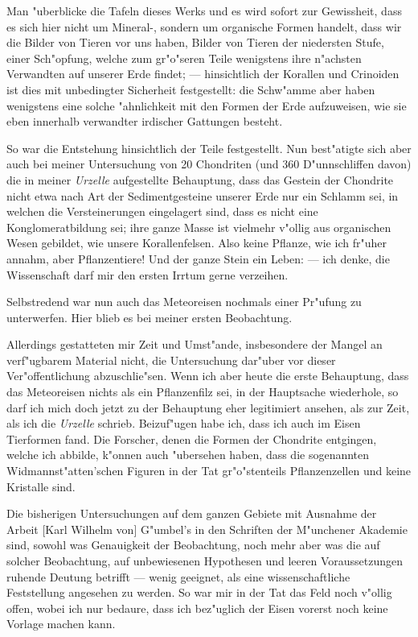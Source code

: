 \documentclass[a4paper, 11pt, oneside]{article}
\begin{document}
Man "uberblicke die Tafeln dieses Werks und es wird sofort zur Gewissheit, dass es sich hier nicht um Mineral-, sondern um organische Formen handelt, dass wir die Bilder von Tieren vor uns haben, Bilder von Tieren der niedersten Stufe, einer Sch"opfung, welche zum gr"o"seren Teile wenigstens ihre n"achsten Verwandten auf unserer Erde findet; --- hinsichtlich der Korallen und Crinoiden ist dies mit unbedingter Sicherheit festgestellt: die Schw"amme aber haben wenigstens eine solche "ahnlichkeit mit den Formen der Erde aufzuweisen, wie sie eben innerhalb verwandter irdischer Gattungen besteht.

So war die Entstehung hinsichtlich der Teile festgestellt. Nun best"atigte sich aber auch bei meiner Untersuchung von 20 Chondriten (und 360 D"unnschliffen davon) die in meiner \emph{Urzelle} aufgestellte Behauptung, dass das Gestein der Chondrite nicht etwa nach Art der Sedimentgesteine unserer Erde nur ein Schlamm sei, in welchen die Versteinerungen eingelagert sind, dass es nicht eine Konglomeratbildung sei; ihre ganze Masse ist vielmehr v"ollig aus organischen Wesen gebildet, wie unsere Korallenfelsen. Also keine Pflanze, wie ich fr"uher annahm, aber Pflanzentiere! Und der ganze Stein ein Leben: --- ich denke, die Wissenschaft darf mir den ersten Irrtum gerne verzeihen.

Selbstredend war nun auch das Meteoreisen nochmals einer Pr"ufung zu unterwerfen. Hier blieb es bei meiner ersten Beobachtung.

Allerdings gestatteten mir Zeit und Umst"ande, insbesondere der Mangel an verf"ugbarem Material nicht, die Untersuchung dar"uber vor dieser Ver"offentlichung abzuschlie"sen. Wenn ich aber heute die erste Behauptung, dass das Meteoreisen nichts als ein Pflanzenfilz sei, in der Hauptsache wiederhole, so darf ich mich doch jetzt zu der Behauptung eher legitimiert ansehen, als zur Zeit, als ich die \emph{Urzelle} schrieb. Beizuf"ugen habe ich, dass ich auch im Eisen Tierformen fand. Die Forscher, denen die Formen der Chondrite entgingen, welche ich abbilde, k"onnen auch "ubersehen haben, dass die sogenannten Widmannst"atten'schen Figuren in der Tat gr"o"stenteils Pflanzenzellen und keine Kristalle sind.

Die bisherigen Untersuchungen auf dem ganzen Gebiete mit Ausnahme der Arbeit [Karl Wilhelm von] G"umbel's in den Schriften der M"unchener Akademie sind, sowohl was Genauigkeit der Beobachtung, noch mehr aber was die auf solcher Beobachtung, auf unbewiesenen Hypothesen und leeren Voraussetzungen ruhende Deutung betrifft --- wenig geeignet, als eine wissenschaftliche Feststellung angesehen zu werden. So war mir in der Tat das Feld noch v"ollig offen, wobei ich nur bedaure, dass ich bez"uglich der Eisen vorerst noch keine Vorlage machen kann.
\end{document}
